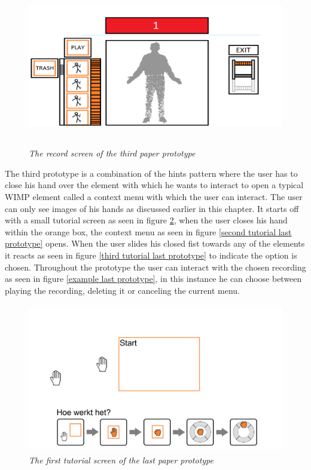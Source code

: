 \begin{figure}[H]
	\begin{center}
		\includegraphics[width=12.5cm, height=7cm]{figures/prototype_6_3_record.png}
		\caption{\emph{The record screen of the third paper prototype}}
		\label{record third prototype}
	\end{center}
\end{figure}

The third prototype is a combination of the hints pattern where the user has to close his hand over the element with which he wants to interact to open a typical WIMP element called a context menu with which the user can interact. The user can only see images of his hands as discussed earlier in this chapter. It starts off with a small tutorial screen as seen in figure \ref{first tutorial last prototype}, when the user closes his hand within the orange box, the context menu as seen in figure \ref{second tutorial last prototype} opens. When the user slides his closed fist towards any of the elements it reacts as seen in figure \ref{third tutorial last prototype} to indicate the option is chosen. Throughout the prototype the user can interact with the chosen recording as seen in figure \ref{example last prototype}, in this instance he can choose between playing the recording, deleting it or canceling the current menu.\\

\begin{figure}[H]
	\begin{center}
		\includegraphics[width=12cm, height=6.5cm]{figures/prototype_7_6_tutorial_1.png}
		\caption{\emph{The first tutorial screen of the last paper prototype}}
		\label{first tutorial last prototype}
	\end{center}
\end{figure}

